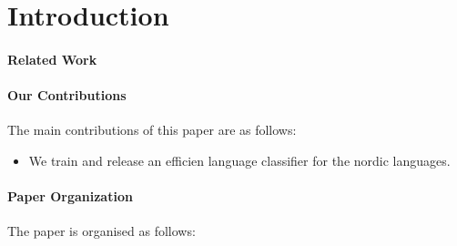 \section{Introduction}\label{sec:introduction}


\paragraph{Related Work}

\paragraph{Our Contributions} 
The main contributions of this paper are as follows:
\begin{itemize}
    \item We train and release an efficien language classifier for the nordic languages. 
\end{itemize}

\paragraph{Paper Organization}
The paper is organised as follows: 

